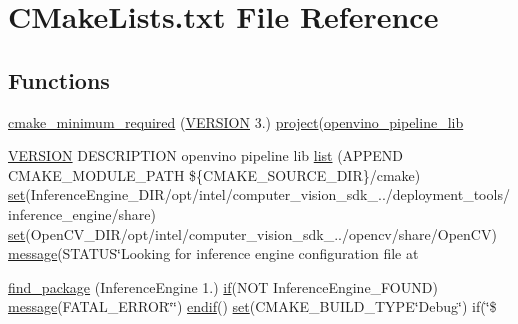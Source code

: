 \hypertarget{CMakeLists_8txt}{}\section{C\+Make\+Lists.\+txt File Reference}
\label{CMakeLists_8txt}
\subsection*{Functions}
\begin{DoxyCompactItemize}
\item 
\hyperlink{CMakeLists_8txt_ae102401aa777534a476dc25cf0f37d02}{cmake\+\_\+minimum\+\_\+required} (\hyperlink{config_8h_a1c6d5de492ac61ad29aec7aa9a436bbf}{V\+E\+R\+S\+I\+ON} 3.) \hyperlink{thirdparty_2gflags_2test_2nc_2CMakeLists_8txt_aaaab102ad489901a4186e3e5ceb993a6}{project}(\hyperlink{CMakeCache_8txt_a1825c89fbdf0553625ee2c5a9edcdf7f}{openvino\+\_\+pipeline\+\_\+lib}
\item 
\hyperlink{config_8h_a1c6d5de492ac61ad29aec7aa9a436bbf}{V\+E\+R\+S\+I\+ON} D\+E\+S\+C\+R\+I\+P\+T\+I\+ON openvino pipeline lib \hyperlink{CMakeLists_8txt_a548e427ae9357a6f3536cff3ca23efda}{list} (A\+P\+P\+E\+ND C\+M\+A\+K\+E\+\_\+\+M\+O\+D\+U\+L\+E\+\_\+\+P\+A\+TH \$\{C\+M\+A\+K\+E\+\_\+\+S\+O\+U\+R\+C\+E\+\_\+\+D\+IR\}/cmake) \hyperlink{thirdparty_2gflags_2test_2CMakeLists_8txt_aed8cdd0ccd70519e5f2523d3a9f63075}{set}(Inference\+Engine\+\_\+\+D\+IR/opt/intel/computer\+\_\+vision\+\_\+sdk\+\_../deployment\+\_\+tools/inference\+\_\+engine/share) \hyperlink{thirdparty_2gflags_2test_2CMakeLists_8txt_aed8cdd0ccd70519e5f2523d3a9f63075}{set}(Open\+C\+V\+\_\+\+D\+IR/opt/intel/computer\+\_\+vision\+\_\+sdk\+\_../opencv/share/Open\+CV) \hyperlink{CMakeLists_8txt_a5a0e1bdb38f357e7237b7fd6faec9bbc}{message}(S\+T\+A\+T\+US\char`\"{}Looking for inference engine configuration file at
\item 
\hyperlink{CMakeLists_8txt_a04fb5360b7c5ec61901f22d43156f47a}{find\+\_\+package} (Inference\+Engine 1.) \hyperlink{thirdparty_2gflags_2test_2CMakeLists_8txt_a102cdd39d1229ea99555942b43b6a137}{if}(N\+OT Inference\+Engine\+\_\+\+F\+O\+U\+ND) \hyperlink{CMakeLists_8txt_a5a0e1bdb38f357e7237b7fd6faec9bbc}{message}(F\+A\+T\+A\+L\+\_\+\+E\+R\+R\+OR\char`\"{}\char`\"{}) \hyperlink{thirdparty_2gflags_2test_2CMakeLists_8txt_ac0f4e661f1b3de8d0e7e1b548fd08916}{endif}() \hyperlink{thirdparty_2gflags_2test_2CMakeLists_8txt_aed8cdd0ccd70519e5f2523d3a9f63075}{set}(C\+M\+A\+K\+E\+\_\+\+B\+U\+I\+L\+D\+\_\+\+T\+Y\+PE\char`\"{}Debug\char`\"{}) if(\char`\"{}\$

\end{DoxyCompactItemize}
